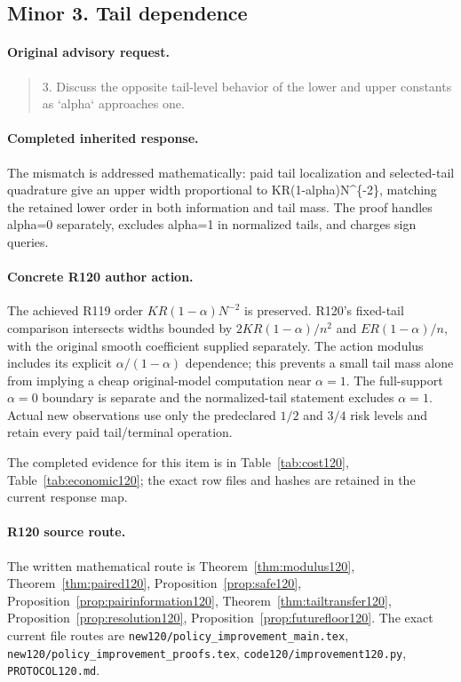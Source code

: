 \subsection{Minor 3. Tail dependence}
\label{response120:minor-3}
\paragraph{Original advisory request.}
\begin{quote}
3. Discuss the opposite tail-level behavior of the lower and upper constants as `alpha` approaches one.
\end{quote}
\paragraph{Completed inherited response.}
The mismatch is addressed mathematically: paid tail localization and selected-tail quadrature give an upper width proportional to KR(1-alpha)N\textasciicircum{}\{-2\}, matching the retained lower order in both information and tail mass. The proof handles alpha=0 separately, excludes alpha=1 in normalized tails, and charges sign queries.
\paragraph{Concrete R120 author action.}
The achieved R119 order $KR(1-\alpha)N^{-2}$ is preserved. R120's fixed-tail comparison intersects widths bounded by $2KR(1-\alpha)/n^2$ and $ER(1-\alpha)/n$, with the original smooth coefficient supplied separately. The action modulus includes its explicit $\alpha/(1-\alpha)$ dependence; this prevents a small tail mass alone from implying a cheap original-model computation near $\alpha=1$. The full-support $\alpha=0$ boundary is separate and the normalized-tail statement excludes $\alpha=1$. Actual new observations use only the predeclared $1/2$ and $3/4$ risk levels and retain every paid tail/terminal operation.

The completed evidence for this item is in Table~\ref{tab:cost120}, Table~\ref{tab:economic120}; the exact row files and hashes are retained in the current response map.
\paragraph{R120 source route.}
The written mathematical route is Theorem~\ref{thm:modulus120}, Theorem~\ref{thm:paired120}, Proposition~\ref{prop:safe120}, Proposition~\ref{prop:pairinformation120}, Theorem~\ref{thm:tailtransfer120}, Proposition~\ref{prop:resolution120}, Proposition~\ref{prop:futurefloor120}. The exact current file routes are \nolinkurl{new120/policy_improvement_main.tex}, \nolinkurl{new120/policy_improvement_proofs.tex}, \nolinkurl{code120/improvement120.py}, \nolinkurl{PROTOCOL120.md}.
